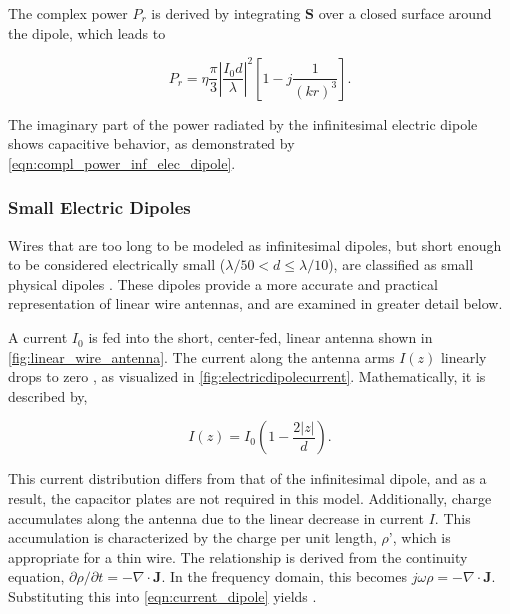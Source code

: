 The complex power $P_r$ is derived by integrating $\mathbf{S}$ over a closed surface around the dipole, which leads to \cite[p. 154]{Balanis_1997}

\begin{equation}
	P_r = \eta \frac{\pi}{3}  \left|\frac{I_0d}{\lambda}\right|^2 \left[ 1 - j \frac{1}{(kr)^3} \right].
	\label{eqn:compl_power_inf_elec_dipole}
\end{equation}

The imaginary part of the power radiated by the infinitesimal electric dipole shows capacitive behavior, as demonstrated by \eqref{eqn:compl_power_inf_elec_dipole}.

\subsubsection{Small Electric Dipoles}\label{sec:small_electric_dipole}

Wires that are too long to be modeled as infinitesimal dipoles, but short enough to be considered electrically small ($\lambda / 50 < d \leq \lambda/10$), are classified as small physical dipoles \cite[pp. 162-163]{Balanis_1997}. These dipoles provide a more accurate and practical representation of linear wire antennas, and are examined in greater detail below.

A current $I_0$ is fed into the short, center-fed, linear antenna shown in \autoref{fig:linear_wire_antenna}. The current along the antenna arms $I(z)$ linearly drops to zero \cite[p. 412]{Jackson}, as visualized in \autoref{fig:electricdipolecurrent}. Mathematically, it is described by, 

\begin{equation}
    {I}(z)=  I_0\left( 1-\frac{2|z|}{d} \right).
    \label{eqn:current_dipole}
\end{equation}

This current distribution differs from that of the infinitesimal dipole, and as a result, the capacitor plates are not required in this model. Additionally, charge accumulates along the antenna due to the linear decrease in current ${I}$. This accumulation is characterized by the charge per unit length, $\rho’$, which is appropriate for a thin wire. The relationship is derived from the continuity equation, $\partial \rho/\partial t = -\nabla \cdot \mathbf{J}$. In the frequency domain, this becomes $j\omega \rho = -\nabla \cdot \mathbf{J}$. Substituting this into \eqref{eqn:current_dipole} yields \cite[pp. 410-412]{Jackson}.

